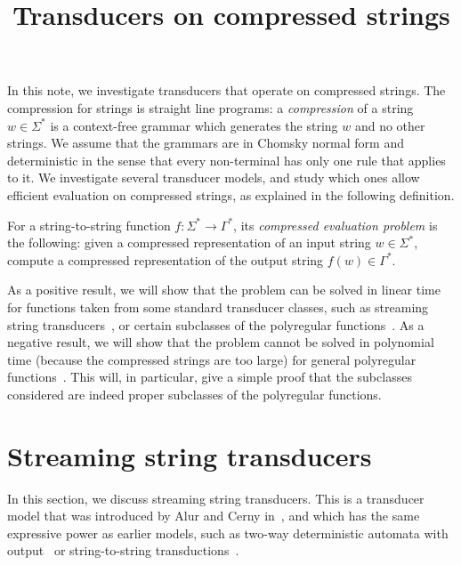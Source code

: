 \documentclass{article}
\begin{document}
\title{Transducers on compressed strings}
\maketitle
In this note, we investigate transducers that operate on compressed strings. The compression for strings is straight line programs: a \emph{compression} of a string $w \in \Sigma^*$ is a context-free grammar which generates the string $w$ and no other strings. We assume that the grammars are in Chomsky normal form and deterministic in the sense that every non-terminal has only one rule that applies to it.
We investigate several transducer models, and study which ones allow efficient evaluation on compressed strings, as explained in the following definition. 

\begin{definition}\label{sec:}
    For a string-to-string function $f: \Sigma^* \to \Gamma^*$, its \emph{compressed evaluation problem} is the following: given a compressed representation of an input string $w \in \Sigma^*$, compute a compressed representation of the output string $f(w) \in \Gamma^*$.
\end{definition}

As a positive result, we will show that the problem can be solved in linear time for functions taken from some standard transducer classes, such as streaming string transducers~\cite{alurExpressivenessStreamingString2010}, or certain subclasses of the polyregular functions~\cite{douneautabot_et_al:LIPIcs:2020:12697,NguyenNP21}. As a negative result, we will show that the problem cannot be solved in polynomial time (because the compressed strings are too large) for general polyregular functions~\cite{bojanczykPolyregularFunctions2018}.  This will, in particular, give a simple proof that the subclasses considered are indeed proper subclasses of the polyregular functions. 


\section{Streaming string transducers}
In this section, we discuss streaming string transducers. This is a  transducer model that was introduced by Alur and Cerny in~\cite{alurExpressivenessStreamingString2010}, and which has the same expressive power as earlier models, such as two-way deterministic automata with output~\cite{shepherdson1959reduction} or string-to-string \mso transductions~\cite{engelfrietMSODefinableString2001}.
\end{document}
